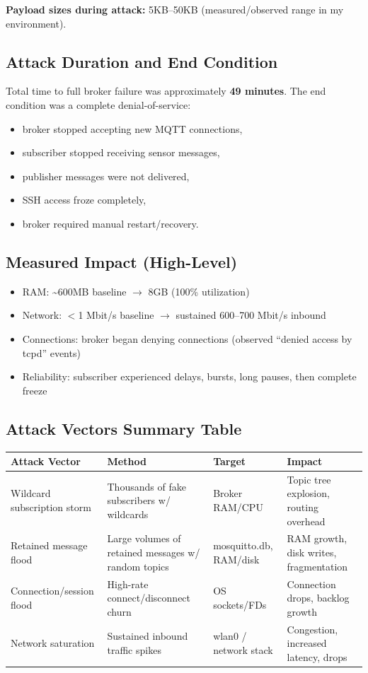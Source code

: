 \documentclass[11pt]{article}
\begin{document}
\textbf{Payload sizes during attack:} 5KB--50KB (measured/observed range in my environment).

\subsection{Attack Duration and End Condition}
Total time to full broker failure was approximately \textbf{49 minutes}. The end condition was a complete denial-of-service:
\begin{itemize}
  \item broker stopped accepting new MQTT connections,
  \item subscriber stopped receiving sensor messages,
  \item publisher messages were not delivered,
  \item SSH access froze completely,
  \item broker required manual restart/recovery.
\end{itemize}

\subsection{Measured Impact (High-Level)}
\begin{itemize}
  \item RAM: \textasciitilde600MB baseline $\rightarrow$ 8GB (100\% utilization)
  \item Network: $<$1 Mbit/s baseline $\rightarrow$ sustained 600--700 Mbit/s inbound
  \item Connections: broker began denying connections (observed ``denied access by tcpd'' events)
  \item Reliability: subscriber experienced delays, bursts, long pauses, then complete freeze
\end{itemize}

\subsection{Attack Vectors Summary Table}
\begin{table}[h]
\centering
\small
\begin{tabularx}{\linewidth}{@{}lXlX@{}}
\toprule
\textbf{Attack Vector} & \textbf{Method} & \textbf{Target} & \textbf{Impact} \\
\midrule
Wildcard subscription storm & Thousands of fake subscribers w/ wildcards & Broker RAM/CPU & Topic tree explosion, routing overhead \\
Retained message flood & Large volumes of retained messages w/ random topics & mosquitto.db, RAM/disk & RAM growth, disk writes, fragmentation \\
Connection/session flood & High-rate connect/disconnect churn & OS sockets/FDs & Connection drops, backlog growth \\
Network saturation & Sustained inbound traffic spikes & wlan0 / network stack & Congestion, increased latency, drops \\
\bottomrule
\end{tabularx}
\end{table}
\end{document}
